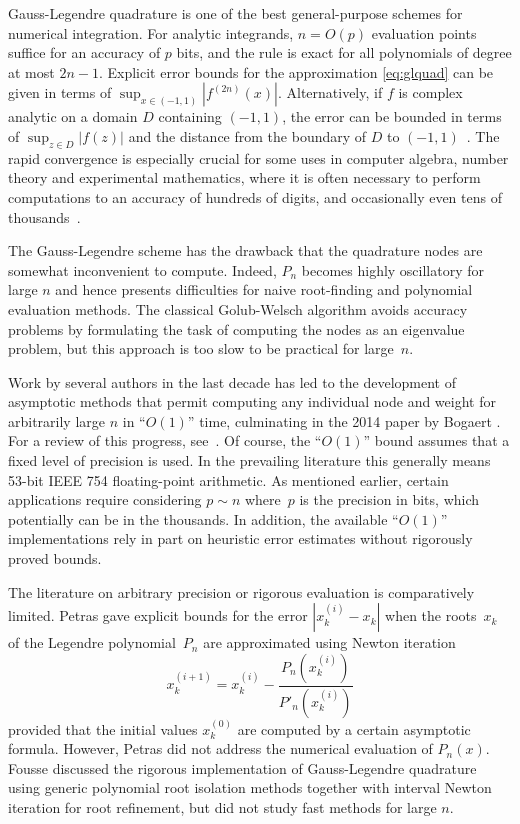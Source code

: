 \documentclass[11pt,a4paper]{article}
\begin{document}
Gauss-Legendre quadrature is one of the best general-purpose
schemes for numerical integration. For analytic integrands,
$n = O(p)$ evaluation points suffice for an accuracy of $p$ bits,
and the rule is exact for all polynomials of degree at most $2n-1$.
Explicit error bounds for the approximation
\eqref{eq:glquad} can be given in terms of
$\sup_{x \in (-1,1)} |f^{(2n)}(x)|$. Alternatively,
if $f$ is complex analytic on a domain $D$ containing $(-1,1)$,
the error can be bounded in terms of $\sup_{z \in D} |f(z)|$
and the distance from the boundary of $D$ to $(-1,1)$~\cite{trefethen2008gauss}.
The rapid convergence is especially crucial
for some uses in computer algebra, number theory and experimental mathematics,
where it is often necessary to perform computations to an accuracy of
hundreds of digits, and occasionally even tens of
thousands~\cite{bailey2011high}.

The Gauss-Legendre scheme has the drawback
that the quadrature nodes are
somewhat inconvenient to compute.
Indeed, $P_n$ becomes highly oscillatory for
large $n$ and hence presents difficulties
for naive root-finding and polynomial evaluation methods.
The classical Golub-Welsch algorithm avoids accuracy problems
by formulating the task of computing the nodes as an eigenvalue problem,
but this approach is too slow to be practical for large~$n$.

Work by several authors in the last decade has led to
the development of asymptotic methods
that permit computing any individual node and weight for arbitrarily large $n$
in ``$O(1)$'' time, culminating in the 2014 paper by Bogaert \cite{bogaert2014iteration}.
For a review of this progress, see~\cite{townsend2015race}.
Of course, the ``$O(1)$'' bound assumes that a fixed
level of precision is used. In the prevailing literature
this generally means 53-bit IEEE 754 floating-point arithmetic.
As mentioned earlier, certain applications require
considering $p \sim n$ where~$p$ is the precision in bits,
which potentially can be in the thousands.
In addition, the available ``$O(1)$'' implementations rely in part
on heuristic error estimates without rigorously proved bounds.

The literature on arbitrary precision or rigorous evaluation
is comparatively limited.
Petras \cite{petras1999computation} gave explicit
bounds for the error $|x_k^{(i)} - x_k|$ when
the roots $x_k$ of the Legendre polynomial $P_n$
are approximated using Newton iteration
\[ x^{(i+1)}_k = x^{(i)}_k - \frac{P_n(x^{(i)}_k)}{P'_n(x^{(i)}_k)} \]
provided that the initial values $x^{(0)}_k$
are computed by a certain asymptotic formula.
However, Petras did not address the numerical evaluation of $P_n(x)$.
Fousse \cite{fousse2007accurate} discussed the rigorous implementation
of Gauss-Legendre quadrature
using generic polynomial root isolation methods together with interval Newton iteration
for root refinement,
but did not study fast methods for large $n$.
\end{document}
